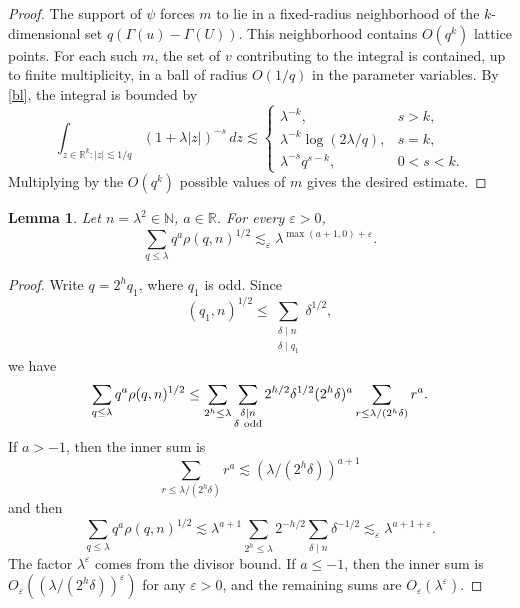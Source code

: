 \documentclass[11pt,reqno]{amsart}
\newtheorem{lemma}[theorem]{Lemma}
\numberwithin{equation}{section}
\newcommand{\1}{\textbf{1}}
\newcommand{\ls}{\lesssim}
\newcommand{\R}{\mathbb R}
\newcommand{\eps}{\varepsilon}
\newcommand{\la}{\lambda}
\begin{document}
	
	\begin{proof}
		The support of $\psi$ forces $m$ to lie in a fixed-radius neighborhood of the $k$-dimensional set $q(\Gamma(u)-\Gamma(U))$. This neighborhood contains $O(q^k)$ lattice points. For each such $m$, the set of $v$ contributing to the integral is contained, up to finite multiplicity, in a ball of radius $O(1/q)$ in the parameter variables. By \eqref{bl}, the integral is bounded by
		\[
		\int_{z\in \mathbb{R}^k:|z|\ls 1/q}(1+\lambda |z|)^{-s}\,dz
		\ls
		\begin{cases}
			\lambda^{-k},&s>k,\\
			\lambda^{-k}\log(2\lambda/q),&s=k,\\
			\lambda^{-s}q^{s-k},&0<s<k.
		\end{cases}
		\]
		Multiplying by the $O(q^k)$ possible values of $m$ gives the desired estimate.
	\end{proof}
	\begin{lemma}\label{lem:rho-absorption}
		Let \(n=\la^2\in\mathbb{N}\), \(a\in\R\).  For every
		\(\eps>0\),
		\[
		\sum_{q\le \la}q^a\rho(q,n)^{1/2}
		\ls_{\eps} \la^{\max(a+1,0)+\eps}.
		\]
	\end{lemma}
	
	\begin{proof}
		Write \(q=2^h q_1\), where \(q_1\) is odd.  Since
		\[
		(q_1,n)^{1/2}\le
		\sum_{\substack{\delta\mid n\\ \delta\mid q_1}}\delta^{1/2},
		\]
		we have
		\[
		\sum_{q\le \la}q^a\rho(q,n)^{1/2}
		\le
		\sum_{2^h\le \la}
		\sum_{\substack{\delta\mid n\\ \delta\ {\rm odd}}}
		2^{h/2}\delta^{1/2}(2^h\delta)^a
		\sum_{r\le \la/(2^h\delta)}r^a.
		\]
		If \(a>-1\), then the inner sum is 
		\[\sum_{r\le \la/(2^h\delta)}r^a\ls (\la/(2^h\delta))^{a+1}\] and then
		\[
		\sum_{q\le \la}q^a\rho(q,n)^{1/2}\ls \la^{a+1}\sum_{2^h\le \la}2^{-h/2}
		\sum_{\delta\mid n}\delta^{-1/2}
		\ls_{\eps}\la^{a+1+\eps}.
		\]
		The factor $\la^\eps$ comes from the divisor bound.
		If \(a\le-1\), then the inner sum is \(O_\eps( (\la/(2^h\delta))^{\eps})\) for any $\eps>0$, and the remaining sums are
		\(O_{\eps}(\la^\eps)\). 
	\end{proof}
	
\end{document}
